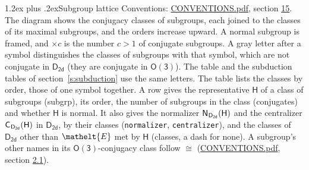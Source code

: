 \documentclass[10pt,a4paper]{article}
\makeatletter
\renewcommand\section{\@startsection{section}{1}{\z@}{-3ex plus -1ex minus -.2ex}%
  {1.2ex plus .2ex}{\normalfont\large\sffamily\bfseries\color{parttitle}}}
\numberwithin{equation}{section}
\newcommand{\eltfont}[1]{{\let\sigma\eltsigma\mathelt{#1}}}
\newcommand{\grp}[1]{\mathsf{#1}}
\newcommand{\cls}[1]{\eltfont{#1}}
\newcommand{\samecls}{\cong}
\newcommand{\nconj}[1]{{\scriptsize$\times#1$}}
\newcommand{\clsletter}[1]{\,{\scriptsize\color{black!55}#1}}
\newcommand{\hairsp}{\mkern1mu}
\makeatother
\begin{document}
\section{Subgroup lattice}\label{s:subgroups}
Conventions: \href{../../CONVENTIONS.pdf}{CONVENTIONS.pdf}, section \href{../../CONVENTIONS.pdf\#conv.15}{15}.
The diagram shows the conjugacy classes of subgroups, each joined to the classes of its maximal subgroups, and the orders increase upward. A normal subgroup is framed, and ${\times}c$ is the number $c > 1$ of conjugate subgroups. A gray letter after a symbol distinguishes the classes of subgroups with that symbol, which are not conjugate in $\grp{D_{2d}}$ (they are conjugate in \href{O3.pdf}{$\grp{O(3)}$}). The table and the subduction tables of section~\ref{s:subduction} use the same letters. The table lists the classes by order, those of one symbol together. \label{n:group.H}\label{n:head.subgroup}\label{n:head.order}\label{n:head.conjugates}\label{n:head.normal}A row gives the representative $\grp{H}$ of a class of subgroups (subgrp), its order, the number of subgroups in the class (conjugates) and whether $\grp{H}$ is normal. \label{n:group.normalizer}\label{n:group.centralizer}\label{n:head.classes}It also gives the normalizer $\grp{N}_{\hairsp \grp{D_{2d}}}(\grp{H})$ and the centralizer $\grp{C}_{\hairsp \grp{D_{2d}}}(\grp{H})$ in $\grp{D_{2d}}$, by their classes (\texttt{normalizer}, \texttt{centralizer}), and the classes of $\grp{D_{2d}}$ other than $\cls{E}$ met by $\grp{H}$ (classes, a dash for none). A subgroup's other names in its \href{O3.pdf}{$\grp{O(3)}$}-conjugacy class follow $\samecls$ (\href{../../CONVENTIONS.pdf}{CONVENTIONS.pdf}, section \href{../../CONVENTIONS.pdf\#conv.2.1}{2.1}).
\begin{center}
\end{center}
\end{document}
